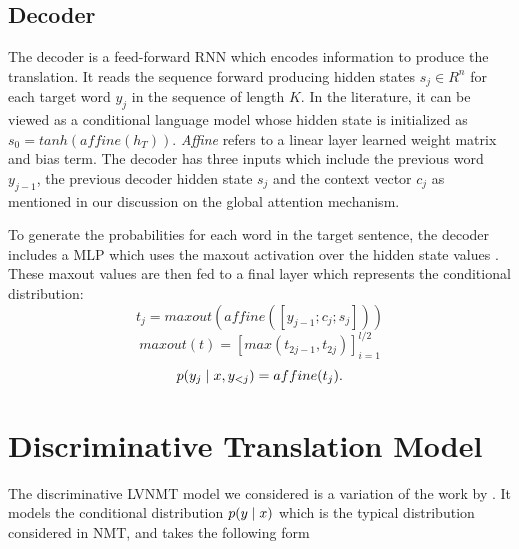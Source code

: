 




\subsection{Decoder}


The decoder is a feed-forward \ac{RNN} which encodes information to produce the translation. It reads the sequence forward producing hidden states $s_{j} \in R^{n}$ for each target word $y_{j}$ in the sequence of length $K$. In the literature, it can be viewed as a conditional language model \cite{koehn2017NMT} whose hidden state is initialized as $s_{0} = tanh(affine(h_{T}))$. \textit{Affine} refers to a linear layer learned weight matrix and bias term. The decoder has three inputs which include the previous word $y_{j-1}$, the previous decoder hidden state $s_{j}$ and the context vector $c_{j}$ as mentioned in our discussion on the global attention mechanism. 


To generate the probabilities for each word in the target sentence, the decoder includes a \ac{MLP} which uses the maxout activation over the hidden state values \cite{goodfellow2013maxout}. These maxout values are then fed to a final layer which represents the conditional distribution:
\begin{equation}
	t_{j} = maxout(affine([y_{j-1}; c_{j}; s_{j} ]))
\end{equation}
\begin{equation}
	maxout(t) = [max(t_{2j -1}, t_{2j})]_{i=1}^{l / 2}
\end{equation}
\begin{equation}
p(y_{j} \; | \;{x, y_{<j}}) = affine(t_{j}).
\end{equation}


\section{Discriminative Translation Model}


The discriminative \ac{LVNMT} model we considered is a variation of the work by \citet{Zhang2016VNMT}. It models the conditional distribution $p(y \; | \;{x})$ which is the typical distribution considered in \ac{NMT}, and takes the following form 

